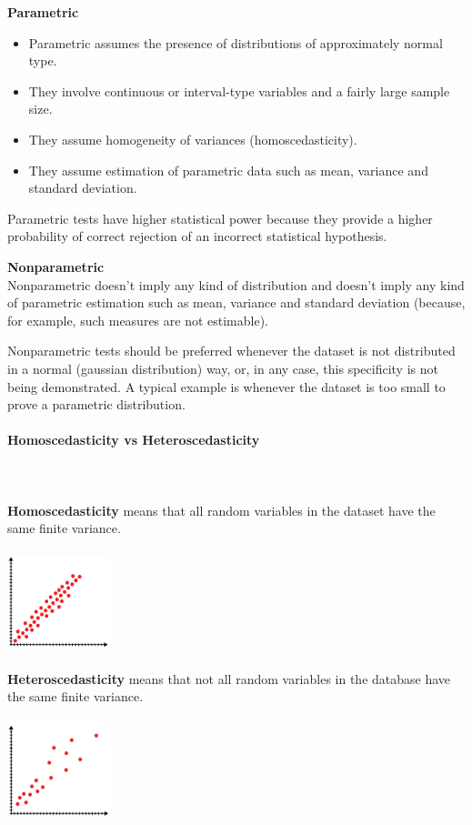 \documentclass{article}
\begin{document}
\textbf{Parametric}
\begin{itemize}
    \item Parametric assumes the presence of distributions of approximately normal type.
    \item They involve continuous or interval-type variables and a fairly large sample size.
    \item They assume homogeneity of variances (homoscedasticity).
    \item They assume estimation of parametric data such as mean, variance and standard deviation.
\end{itemize}

Parametric tests have higher statistical power because they provide a higher probability of correct rejection of an incorrect statistical hypothesis. 

\textbf{Nonparametric}\mbox{} \\
Nonparametric doesn’t imply any kind of distribution and doesn’t imply any kind of parametric estimation such as mean, variance and standard deviation (because, for example, such measures are not estimable).

Nonparametric tests should be preferred whenever the dataset is not distributed in a normal (gaussian distribution) way, or, in any case, this specificity is not being demonstrated. A typical example is whenever the dataset is too small to prove a parametric distribution.

\paragraph{Homoscedasticity vs Heteroscedasticity}\mbox{} \\ 
\mbox{} \\

\textbf{Homoscedasticity} means that all random variables in the dataset have the same finite variance.

\includegraphics[width=3cm, height=3cm]{homoscedasticity}

\textbf{Heteroscedasticity}  means that not all random variables in the database have the same finite variance.

\includegraphics[width=3cm, height=3cm]{heteroscedasticity}
\end{document}
